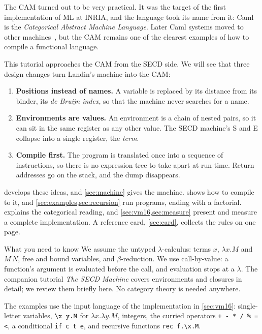\documentclass[11pt,a4paper]{article}
\theoremstyle{definition}
\theoremstyle{plain}
\begin{document}
The CAM turned out to be very practical. It was the target of the first
implementation of ML at INRIA, and the language took its name from it: Caml is
the \emph{Categorical Abstract Machine Language}. Later Caml systems moved to
other machines~\cite{leroy90}, but the CAM remains one of the clearest
examples of how to compile a functional language.

This tutorial approaches the CAM from the SECD side. We will see that three
design changes turn Landin's machine into the CAM:

\begin{enumerate}[itemsep=2pt]
\item \textbf{Positions instead of names.} A variable is replaced by its
  distance from its binder, its \emph{de Bruijn index}, so that the machine
  never searches for a name.
\item \textbf{Environments are values.} An environment is a chain of nested
  pairs, so it can sit in the same register as any other value. The SECD
  machine's S and E collapse into a single register, the \emph{term}.
\item \textbf{Compile first.} The program is translated once into a sequence
  of instructions, so there is no expression tree to take apart at run time.
  Return addresses go on the stack, and the dump disappears.
\end{enumerate}

 develops these ideas, and \cref{sec:machine} gives the
machine.  shows how to compile to it, and
\cref{sec:examples,sec:recursion} run programs, ending with a factorial.
 explains the categorical reading, and
\cref{sec:vm16,sec:measure} present and measure a complete implementation. A
reference card, \cref{sec:card}, collects the rules on one page.

\begin{aside}{What you need to know}
We assume the untyped $\lambda$-calculus: terms $x$, $\lambda x.M$ and $M\,N$,
free and bound variables, and $\beta$-reduction. We use call-by-value: a
function's argument is evaluated before the call, and evaluation stops at a
$\lambda$. The companion tutorial \emph{The SECD Machine} covers environments
and closures in detail; we review them briefly here. No category theory is
needed anywhere.
\end{aside}

The examples use the input language of the implementation in
\cref{sec:vm16}: single-letter variables, $\verb|\x y.M|$ for
$\lambda x.\lambda y.M$, integers, the curried operators
\verb|+ - * / % = <|, a conditional \verb|if c t e|, and recursive functions
\verb|rec f.\x.M|.
\end{document}
